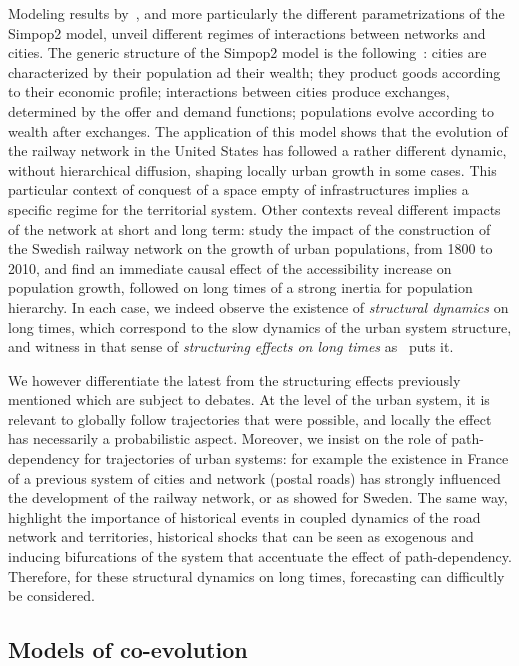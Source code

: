 \documentclass[11pt]{article}
\begin{document}
Modeling results by~\cite{bretagnolle2010comparer}, and more particularly the different parametrizations of the Simpop2 model, unveil different regimes of interactions between networks and cities. The generic structure of the Simpop2 model is the following~\citep{pumain2008socio}: cities are characterized by their population ad their wealth; they product goods according to their economic profile; interactions between cities produce exchanges, determined by the offer and demand functions; populations evolve according to wealth after exchanges. The application of this model shows that the evolution of the railway network in the United States has followed a rather different dynamic, without hierarchical diffusion, shaping locally urban growth in some cases. This particular context of conquest of a space empty of infrastructures implies a specific regime for the territorial system. Other contexts reveal different impacts of the network at short and long term: \cite{berger2017locomotives} study the impact of the construction of the Swedish railway network on the growth of urban populations, from 1800 to 2010, and find an immediate causal effect of the accessibility increase on population growth, followed on long times of a strong inertia for population hierarchy. In each case, we indeed observe the existence of \emph{structural dynamics} on long times, which correspond to the slow dynamics of the urban system structure, and witness in that sense of \emph{structuring effects on long times} as~\cite{pumain2014effets} puts it.

We however differentiate the latest from the structuring effects previously mentioned which are subject to debates. At the level of the urban system, it is relevant to globally follow trajectories that were possible, and locally the effect has necessarily a probabilistic aspect. Moreover, we insist on the role of path-dependency for trajectories of urban systems: for example the existence in France of a previous system of cities and network (postal roads) has strongly influenced the development of the railway network, or as \cite{berger2017locomotives} showed for Sweden. The same way, \cite{doi:10.1068/b39089} highlight the importance of historical events in coupled dynamics of the road network and territories, historical shocks that can be seen as exogenous and inducing bifurcations of the system that accentuate the effect of path-dependency. Therefore, for these structural dynamics on long times, forecasting can difficultly be considered.


\subsection{Models of co-evolution}
\end{document}
